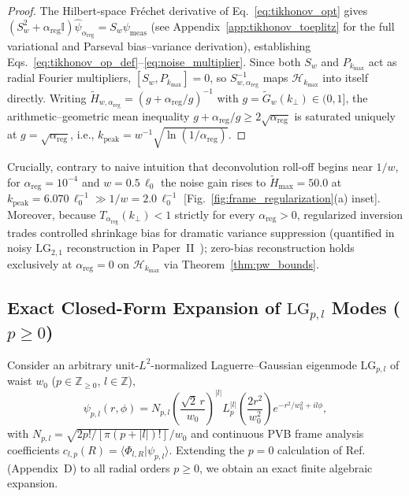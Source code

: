 \documentclass[aps,pra,onecolumn,notitlepage,11pt,tightenlines,nofootinbib,floatfix,longbibliography]{revtex4-2}
\theoremstyle{remark}
\newcommand{\braket}[2]{\langle #1 | #2 \rangle}
\newcommand{\abs}[1]{\lvert #1 \rvert}
\begin{document}
\begin{proof}
The Hilbert-space Fr\'echet derivative of Eq.~\eqref{eq:tikhonov_opt} gives $(S_w^2 + \alpha_{\mathrm{reg}}\mathbb{I})\hat{\psi}_{\alpha_{\mathrm{reg}}} = S_w\psi_{\mathrm{meas}}$ (see Appendix~\ref{app:tikhonov_toeplitz} for the full variational and Parseval bias--variance derivation), establishing Eqs.~\eqref{eq:tikhonov_op_def}--\eqref{eq:noise_multiplier}. Since both $S_w$ and $P_{k_{\max}}$ act as radial Fourier multipliers, $[S_w, P_{k_{\max}}] = 0$, so $S_{w,\alpha_{\mathrm{reg}}}^{-1}$ maps $\mathcal{H}_{k_{\max}}$ into itself directly. Writing $\widetilde{H}_{w,\alpha_{\mathrm{reg}}} = (g + \alpha_{\mathrm{reg}}/g)^{-1}$ with $g = \widetilde{G}_w(k_\perp) \in (0,1]$, the arithmetic--geometric mean inequality $g + \alpha_{\mathrm{reg}}/g \ge 2\sqrt{\alpha_{\mathrm{reg}}}$ is saturated uniquely at $g = \sqrt{\alpha_{\mathrm{reg}}}$, i.e., $k_{\mathrm{peak}} = w^{-1}\sqrt{\ln(1/\alpha_{\mathrm{reg}})}$.
\end{proof}

Crucially, contrary to naive intuition that deconvolution roll-off begins near $1/w$, for $\alpha_{\mathrm{reg}} = 10^{-4}$ and $w = 0.5\,\ell_0$ the noise gain rises to $\widetilde{H}_{\max} = 50.0$ at $k_{\mathrm{peak}} = 6.070\,\ell_0^{-1} \gg 1/w = 2.0\,\ell_0^{-1}$ [Fig.~\ref{fig:frame_regularization}(a) inset]. Moreover, because $T_{\alpha_{\mathrm{reg}}}(k_\perp) < 1$ strictly for every $\alpha_{\mathrm{reg}} > 0$, regularized inversion trades controlled shrinkage bias for dramatic variance suppression (quantified in noisy $\mathrm{LG}_{2,1}$ reconstruction in Paper~II~\cite{AyalaPaperII}); zero-bias reconstruction holds exclusively at $\alpha_{\mathrm{reg}} = 0$ on $\mathcal{H}_{k_{\max}}$ via Theorem~\ref{thm:pw_bounds}.

\subsection{Exact Closed-Form Expansion of \texorpdfstring{$\mathrm{LG}_{p,l}$}{LG\_\{p,l\}} Modes (\texorpdfstring{$p \ge 0$}{p >= 0})}
\label{subsec:lg_expansion}

Consider an arbitrary unit-$L^2$-normalized Laguerre--Gaussian eigenmode $\mathrm{LG}_{p,l}$ of waist $w_0$ ($p \in \mathbb{Z}_{\ge 0}$, $l \in \mathbb{Z}$),
\begin{equation}
\psi_{p,l}(r,\phi) = N_{p,l}\left(\frac{\sqrt{2}\,r}{w_0}\right)^{\abs{l}} L_p^{\abs{l}}\!\left(\frac{2r^2}{w_0^2}\right) e^{-r^2/w_0^2 + il\phi},
\label{eq:lg_def}
\end{equation}
with $N_{p,l} = \sqrt{2p!/[\pi(p+\abs{l})!]}/w_0$ and continuous PVB frame analysis coefficients $c_{l,p}(R) = \braket{\Phi_{l,R}}{\psi_{p,l}}$. Extending the $p = 0$ calculation of Ref.~\cite{Ferreira2026} (Appendix~D) to all radial orders $p \ge 0$, we obtain an exact finite algebraic expansion.
\end{document}
